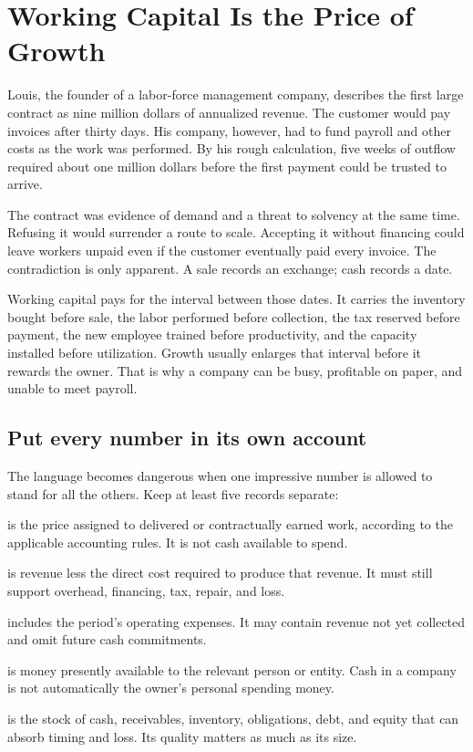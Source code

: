 \chapter{Working Capital Is the Price of Growth}

Louis, the founder of a labor-force management company, describes the first
large contract as nine million dollars of annualized revenue. The customer
would pay invoices after thirty days. His company, however, had to fund payroll
and other costs as the work was performed. By his rough calculation, five weeks
of outflow required about one million dollars before the first payment could be
trusted to arrive.

The contract was evidence of demand and a threat to solvency at the same time.
Refusing it would surrender a route to scale. Accepting it without financing
could leave workers unpaid even if the customer eventually paid every invoice.
The contradiction is only apparent. A sale records an exchange; cash records a
date.

Working capital pays for the interval between those dates. It carries the
inventory bought before sale, the labor performed before collection, the tax
reserved before payment, the new employee trained before productivity, and the
capacity installed before utilization. Growth usually enlarges that interval
before it rewards the owner. That is why a company can be busy, profitable on
paper, and unable to meet payroll.

\section{Put every number in its own account}

The language becomes dangerous when one impressive number is allowed to stand
for all the others. Keep at least five records separate:

\begin{description}[leftmargin=2.5em,style=nextline]
\item[Revenue] is the price assigned to delivered or contractually earned work,
  according to the applicable accounting rules. It is not cash available to
  spend.
\item[Gross profit] is revenue less the direct cost required to produce that
  revenue. It must still support overhead, financing, tax, repair, and loss.
\item[Operating profit] includes the period's operating expenses. It may contain
  revenue not yet collected and omit future cash commitments.
\item[Cash] is money presently available to the relevant person or entity. Cash
  in a company is not automatically the owner's personal spending money.
\item[Balance-sheet capacity] is the stock of cash, receivables, inventory,
  obligations, debt, and equity that can absorb timing and loss. Its quality
  matters as much as its size.
\end{description}

